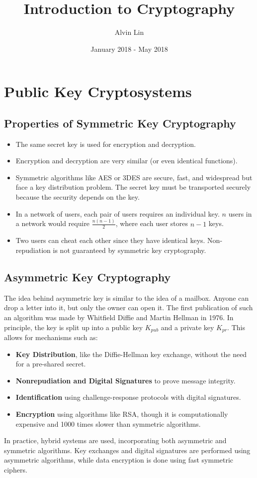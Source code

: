 \documentclass{math}
\title{Introduction to Cryptography}
\author{Alvin Lin}
\date{January 2018 - May 2018}
\begin{document}
\maketitle

\section*{Public Key Cryptosystems}

\subsection*{Properties of Symmetric Key Cryptography}
\begin{itemize}
  \item The same secret key is used for encryption and decryption.
  \item Encryption and decryption are very similar (or even identical
  functions).
  \item Symmetric algorithms like AES or 3DES are secure, fast, and widespread
  but face a key distribution problem. The secret key must be transported
  securely because the security depends on the key.
  \item In a network of users, each pair of users requires an individual key.
  \( n \) users in a network would require \( \frac{n(n-1)}{2} \), where each
  user stores \( n-1 \) keys.
  \item Two users can cheat each other since they have identical keys.
  Non-repudiation is not guaranteed by symmetric key cryptography.
\end{itemize}

\subsection*{Asymmetric Key Cryptography}
The idea behind asymmetric key is similar to the idea of a mailbox. Anyone can
drop a letter into it, but only the owner can open it. The first publication of
such an algorithm was made by Whitfield Diffie and Martin Hellman in 1976. In
principle, the key is split up into a public key \( K_{pub} \) and a private key
\( K_{pr} \). This allows for mechanisms such as:
\begin{itemize}
  \item \textbf{Key Distribution}, like the Diffie-Hellman key exchange,
  without the need for a pre-shared secret.
  \item \textbf{Nonrepudiation and Digital Signatures} to prove message
  integrity.
  \item \textbf{Identification} using challenge-response protocols with
  digital signatures.
  \item \textbf{Encryption} using algorithms like RSA, though it is
  computationally expensive and 1000 times slower than symmetric algorithms.
\end{itemize}
In practice, hybrid systems are used, incorporating both asymmetric and
symmetric algorithms. Key exchanges and digital signatures are performed using
asymmetric algorithms, while data encryption is done using fast symmetric
ciphers.
\end{document}
